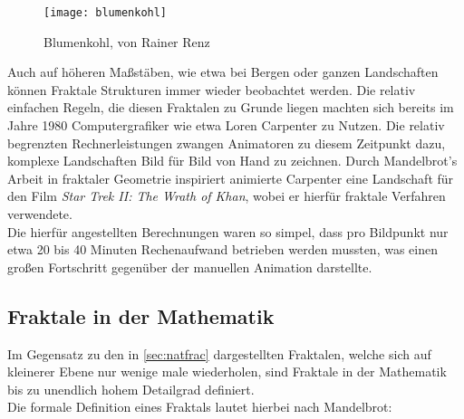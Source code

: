\documentclass[a4paper,12pt,onesided]{report}
\begin{document}
\begin{figure}[H]
	\centering
	\texttt{[image: blumenkohl]}
	\caption{Blumenkohl, von Rainer Renz}
	\label{fig:blumenkohl}
\end{figure}

Auch auf höheren Maßstäben, wie etwa bei Bergen oder ganzen Landschaften können Fraktale Strukturen immer wieder beobachtet werden. 
Die relativ einfachen Regeln, die diesen Fraktalen zu Grunde liegen machten sich bereits im Jahre 1980 Computergrafiker wie etwa Loren Carpenter zu Nutzen. Die relativ begrenzten Rechnerleistungen zwangen Animatoren zu diesem Zeitpunkt dazu, komplexe Landschaften Bild für Bild von Hand zu zeichnen. Durch Mandelbrot's Arbeit in fraktaler Geometrie inspiriert animierte Carpenter eine Landschaft für den Film \textit{Star Trek II: The Wrath of Khan}, wobei er hierfür fraktale Verfahren verwendete. \cite{startrekFractals}\\
Die hierfür angestellten Berechnungen waren so simpel, dass pro Bildpunkt nur etwa 20 bis 40 Minuten Rechenaufwand betrieben werden mussten, was einen großen Fortschritt gegenüber der manuellen Animation darstellte. \cite{carpenterVolLibre}\\

\subsection{Fraktale in der Mathematik}
Im Gegensatz zu den in \autoref{sec:natfrac} dargestellten Fraktalen, welche sich auf kleinerer Ebene nur wenige male wiederholen, sind Fraktale in der Mathematik bis zu unendlich hohem Detailgrad definiert.\\
Die formale Definition eines Fraktals lautet hierbei nach Mandelbrot:
\end{document}
